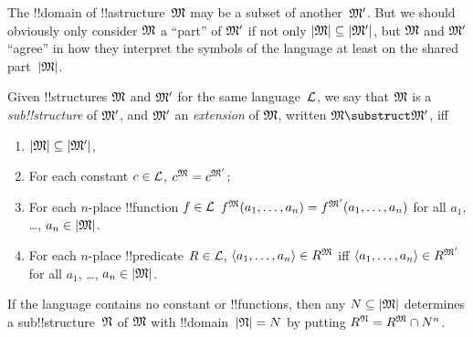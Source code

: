 \documentclass[../../../include/open-logic-section]{subfiles}
\begin{document}

The !!{domain} of !!a{structure}~$\Struct{M}$ may be a subset of
another~$\Struct{M'}$.  But we should obviously only consider
$\Struct{M}$ a ``part'' of $\Struct{M'}$ if not only $\Domain{M}
\subseteq \Domain{M'}$, but $\Struct{M}$ and $\Struct{M'}$ ``agree''
in how they interpret the symbols of the language at least on the
shared part~$\Domain{M}$.

\begin{defn}
Given !!{structure}s $\Struct M$ and $\Struct M'$ for the same
language~$\Lang L$, we say that $\Struct M$ is a \emph{sub!!{structure}}
of $\Struct M'$, and $\Struct M'$ an \emph{extension} of $\Struct M$,
written $\Struct M \substruct \Struct M'$, iff
\begin{enumerate}
\item $\Domain{M} \subseteq \Domain{M'}$,
\item For each constant $c \in \Lang L$, $\Assign{c}{M} =
    \Assign{c}{M'}$;
\item For each $n$-place !!{function} $f \in \Lang L$
  $\Assign{f}{M}(a_1, \dots, a_n) = \Assign{f}{M'}(a_1, \dots, a_n)$
  for all $a_1$, \dots, $a_n \in \Domain{M}$.
\item For each $n$-place !!{predicate} $R \in \Lang L$, $\langle
  a_1, \dots, a_n\rangle \in \Assign{R}{M}$ iff $\langle a_1, \dots,
  a_n\rangle \in \Assign{R}{M'}$ for all $a_1$, \dots, $a_n \in
  \Domain{M}$.
\end{enumerate}
\end{defn}

\begin{rem}
If the language contains no constant or !!{function}s, then any $N
\subseteq \Domain{M}$ determines a sub!!{structure}~$\Struct{N}$ of
$\Struct M$ with !!{domain}~$\Domain{N} = N$ by putting $\Assign{R}{N} =
\Assign{R}{M} \cap N^n$.
\end{rem}

\end{document}
